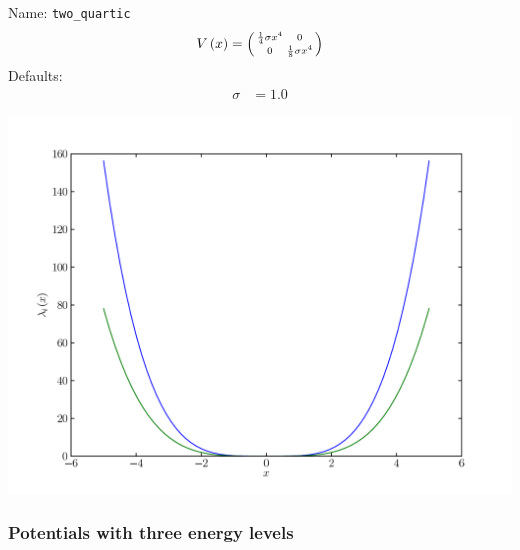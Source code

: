 \documentclass[a4paper,10pt]{report}
\begin{document}
\begin{minipage}{0.5\linewidth}
  Name:    \texttt{two\_quartic}
  \begin{equation*}
    V\left( x \right) = \left(\begin{smallmatrix}\frac{1}{4} \sigma x^{4} & 0\\0 & \frac{1}{8} \sigma x^{4}\end{smallmatrix}\right)
  \end{equation*}
  Defaults:
  \begin{align*}
    \sigma & = 1.0
  \end{align*}
\end{minipage}
\begin{minipage}{0.5\linewidth}
  \begin{center}
    \includegraphics[scale=0.25]{./fig/two_quartic.pdf}
  \end{center}
\end{minipage}


\subsubsection{Potentials with three energy levels}
\end{document}

